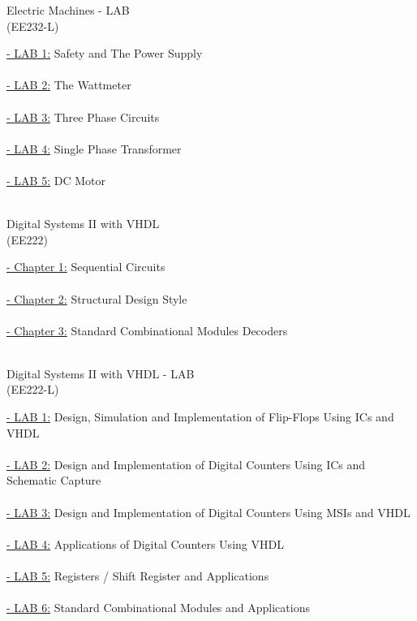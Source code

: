 \documentclass[12pt, a4paper]{article}
\begin{document}
\newpage 
\begin{center}
\Huge 
Electric Machines - LAB  \\ (EE232-L) 
\end{center}
\normalsize
\large \underline{- LAB 1:} Safety and The Power Supply \\ \\
\large \underline{- LAB 2:} The Wattmeter \\ \\
\large \underline{- LAB 3:} Three Phase Circuits \\ \\
\large \underline{- LAB 4:} Single Phase Transformer\\ \\
\large \underline{- LAB 5:} DC Motor \\ \\



\newpage 
\begin{center}
\Huge 
Digital Systems II with VHDL\\ (EE222)\\ 
\end{center}
\normalsize
\large \underline{- Chapter 1:} Sequential Circuits\\ \\
\large \underline{- Chapter 2:} Structural Design Style\\ \\
\large \underline{- Chapter 3:} Standard Combinational Modules Decoders\\ \\


\newpage 
\begin{center}
\Huge 
Digital Systems II with VHDL - LAB  \\ (EE222-L) %
\end{center}
\large \underline{- LAB 1:} Design, Simulation and Implementation of
Flip-Flops Using ICs and VHDL \\ \\
\large \underline{- LAB 2:} Design and Implementation of Digital Counters Using ICs and Schematic Capture\\ \\
\large \underline{- LAB 3:} Design and Implementation of Digital Counters Using MSIs and VHDL \\ \\
\large \underline{- LAB 4:} Applications of Digital Counters Using VHDL\\ \\
\large \underline{- LAB 5:} Registers / Shift Register and Applications \\ \\
\large \underline{- LAB 6:} Standard Combinational Modules and Applications \\ \\
\end{document}
